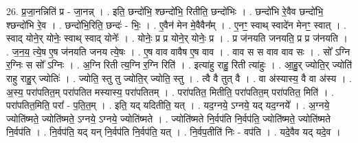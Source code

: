 \documentclass[17pt]{extarticle}
\begin{document}
26. प्र॒जा॒नन्निति॑ प्र - जा॒नन्न् । . इति॒ छन्दो॑भि॒ श्छन्दो॑भि॒ रितीति॒ छन्दो॑भिः । . छन्दो॑भि रे॒वैव छन्दो॑भि॒ श्छन्दो॑भि रे॒व । . छन्दो॑भि॒रिति॒ छन्दः॑ - भिः॒ । . ए॒वैन॑ मेन मे॒वैवैन᳚म् । . ए॒नꣳ॒॒ स्वाथ् स्वादे॑न मेनꣳ॒॒ स्वात् । . स्वाद् योने॒र् योनेः॒ स्वाथ् स्वाद् योनेः᳚ । . योनेः॒ प्र प्र योने॒र् योनेः॒ प्र । . प्र ज॑नयति जनयति॒ प्र प्र ज॑नयति । . ज॒न॒य॒ त्ये॒ष ए॒ष ज॑नयति जनय त्ये॒षः । . ए॒ष वाव वावैष ए॒ष वाव । . वाव स स वाव वाव सः । . सो᳚ ऽग्नि र॒ग्निः स सो᳚ ऽग्निः । . अ॒ग्नि रिती त्य॒ग्नि र॒ग्नि रिति॑ । . इत्या॑हु राहु॒ रिती त्या॑हुः । . आ॒हु॒र् ज्योति॒र् ज्योति॑ राहु राहु॒र् ज्योतिः॑ । . ज्योति॒ स्तु तु ज्योति॒र् ज्योति॒ स्तु । . त्वै वै तुत् वै । . वा अ॑स्यास्य॒ वै वा अ॑स्य । . अ॒स्य॒ परा॑पतित॒म् परा॑पतित मस्यास्य॒ परा॑पतितम् । . परा॑पतित॒ मितीति॒ परा॑पतित॒म् परा॑पतित॒ मिति॑ । . परा॑पतित॒मिति॒ परा᳚ - प॒ति॒त॒म् । . इति॒ यद् यदितीति॒ यत् । . यद॒ग्नये॒ ऽग्नये॒ यद् यद॒ग्नये᳚ । . अ॒ग्नये॒ ज्योति॑ष्मते॒ ज्योति॑ष्मते॒ ऽग्नये॒ ऽग्नये॒ ज्योति॑ष्मते । . ज्योति॑ष्मते नि॒र्वप॑ति नि॒र्वप॑ति॒ ज्योति॑ष्मते॒ ज्योति॑ष्मते नि॒र्वप॑ति । . नि॒र्वप॑ति॒ यद् यन् नि॒र्वप॑ति नि॒र्वप॑ति॒ यत् । . नि॒र्वप॒तीति॑ निः - वप॑ति । . यदे॒वैव यद् यदे॒व । \newline
\end{document}
